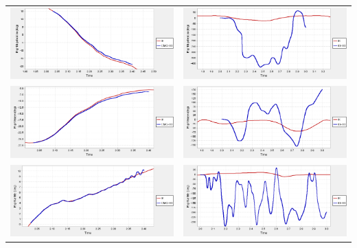 \begin{center}
    \begin{tabular}{cc}
        \includegraphics[width=.48\textwidth, keepaspectratio]{fig/hip-ik-cmc.png} & \includegraphics[width=.48\textwidth, keepaspectratio]{fig/hip-ik-id.png}\\[3pt]
        \includegraphics[width=.48\textwidth, keepaspectratio]{fig/knee-ik-cmc.png} & \includegraphics[width=.48\textwidth, keepaspectratio]{fig/knee-ik-id.png}\\[3pt]
        \includegraphics[width=.48\textwidth, keepaspectratio]{fig/ankle-ik-cmc.png} & \includegraphics[width=.48\textwidth, keepaspectratio]{fig/ankle-ik-id.png}
    \end{tabular}
    \label{tab:fd-cmc-id}
\end{center}

